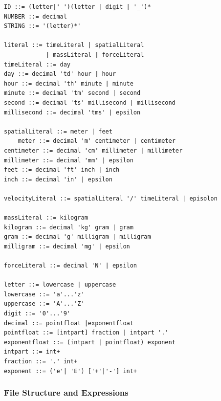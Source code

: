 \begin{verbatim}
ID ::= (letter|'_')(letter | digit | '_')*
NUMBER ::= decimal
STRING ::= '(letter)*'

literal ::= timeLiteral | spatialLiteral 
            | massLiteral | forceLiteral
timeLiteral ::= day
day ::= decimal 'td' hour | hour
hour ::= decimal 'th' minute | minute
minute ::= decimal 'tm' second | second
second ::= decimal 'ts' millisecond | millisecond 
millisecond ::= decimal 'tms' | epsilon

spatialLiteral ::= meter | feet
	meter ::= decimal 'm' centimeter | centimeter
centimeter ::= decimal 'cm' millimeter | millimeter
millimeter ::= decimal 'mm' | epsilon
feet ::= decimal 'ft' inch | inch
inch ::= decimal 'in' | epsilon

velocityLiteral ::= spatialLiteral '/' timeLiteral | episolon

massLiteral ::= kilogram
kilogram ::= decimal 'kg' gram | gram
gram ::= decimal 'g' milligram | milligram
milligram ::= decimal 'mg' | epsilon

forceLiteral ::= decimal 'N' | epsilon

letter ::= lowercase | uppercase
lowercase ::= 'a'...'z'
uppercase ::= 'A'...'Z'
digit ::= '0'...'9'
decimal ::= pointfloat |exponentfloat
pointfloat ::= [intpart] fraction | intpart '.'
exponentfloat ::= (intpart | pointfloat) exponent
intpart ::= int+
fraction ::= '.' int+
exponent ::= ('e'| 'E') ['+'|'‐'] int+
\end{verbatim}

\subsubsection{File Structure and Expressions}


